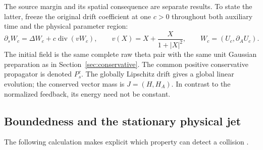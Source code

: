 \documentclass[11pt]{article}
\numberwithin{equation}{section}
\begin{document}
The source margin and its spatial consequence are separate results.
To state the latter, freeze the original drift coefficient at one
$c>0$ throughout both auxiliary time and the physical parameter
region:
\begin{equation}\label{fcg:fixedpde}
 \partial_sW_c=\Delta W_c+c\operatorname{div}(vW_c),\qquad
 v(X)=X+\frac{X}{1+|X|^2},\qquad W_c=(U_c,\partial_AU_c).
\end{equation}
The initial field is the same complete raw theta pair with the same
unit Gaussian preparation as in Section~\ref{sec:conservative}.
The common positive conservative propagator is denoted $P_s^c$.
The globally Lipschitz drift gives a global linear evolution; the
conserved vector mass is $J=(H,H_A)$. In contrast to the normalized
feedback, its energy need not be constant.

\subsection{Boundedness and the stationary physical jet}

The following calculation makes explicit which property can detect
a collision \cite{FCGFixedFamily,FCGClarification}.
\end{document}
